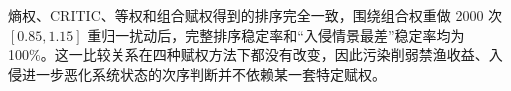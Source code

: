 熵权、CRITIC、等权和组合赋权得到的排序完全一致，围绕组合权重做 2000 次 $[0.85,1.15]$ 重归一扰动后，完整排序稳定率和“入侵情景最差”稳定率均为 100\%。这一比较关系在四种赋权方法下都没有改变，因此污染削弱禁渔收益、入侵进一步恶化系统状态的次序判断并不依赖某一套特定赋权。
